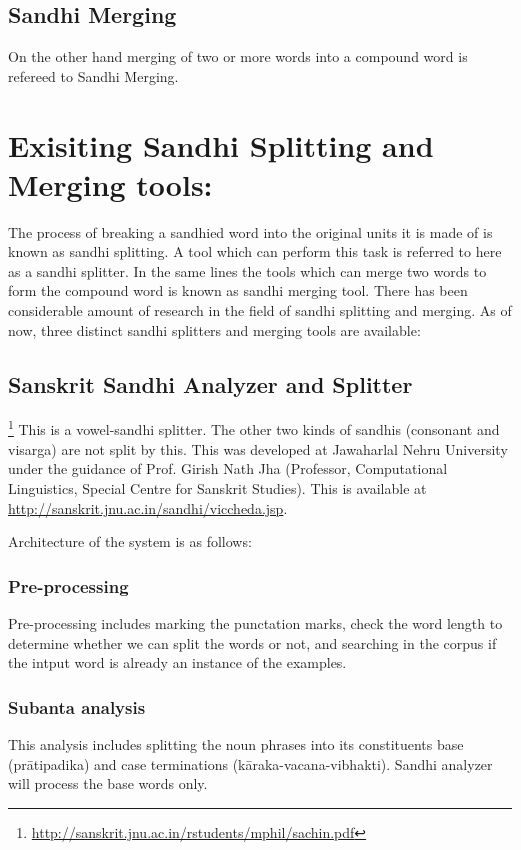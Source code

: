\documentclass[11pt]{article}
\begin{document}
\subsection{Sandhi Merging}
On the other hand merging of two or more words into a compound word is refereed to Sandhi Merging.

\section{Exisiting Sandhi Splitting and Merging tools:}
The process of breaking a sandhied word into the original units it is made of is known as sandhi splitting. A tool which can perform this task is referred to here as a sandhi splitter.  In the same lines the tools which can merge two words to form the compound word is known as sandhi merging tool. 
There has been considerable amount of research in the field of sandhi splitting and merging. As of now, three distinct sandhi splitters and merging tools are available:



\subsection{Sanskrit Sandhi Analyzer and Splitter}\footnote{\url{http://sanskrit.jnu.ac.in/rstudents/mphil/sachin.pdf}} This is a vowel-sandhi splitter. The other two kinds of sandhis (consonant and visarga) are not split by this. This was developed at Jawaharlal Nehru University under the guidance of Prof. Girish Nath Jha (Professor, Computational Linguistics, Special Centre for Sanskrit Studies). This is available at \url{http://sanskrit.jnu.ac.in/sandhi/viccheda.jsp}.

Architecture of the system is as follows:

\subsubsection{Pre-processing}
Pre-processing includes marking the punctation marks, check the word length to determine whether we can split the words or not, and searching in the corpus if the intput word is already an instance of the examples.

\subsubsection{Subanta analysis}
This analysis includes splitting the noun phrases into its constituents base (prātipadika) and case terminations (kāraka-vacana-vibhakti).  Sandhi analyzer  will  process  the  base  words only. 
\end{document}
